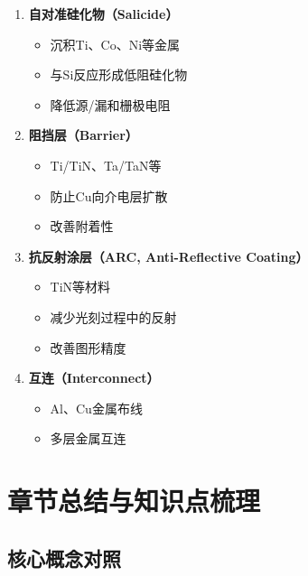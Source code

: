 \documentclass[UTF8,12pt,a4paper]{ctexart}
\begin{document}
\begin{enumerate}
    \item \textbf{自对准硅化物（Salicide）}
    \begin{itemize}
        \item 沉积Ti、Co、Ni等金属
        \item 与Si反应形成低阻硅化物
        \item 降低源/漏和栅极电阻
    \end{itemize}
    
    \item \textbf{阻挡层（Barrier）}
    \begin{itemize}
        \item Ti/TiN、Ta/TaN等
        \item 防止Cu向介电层扩散
        \item 改善附着性
    \end{itemize}
    
    \item \textbf{抗反射涂层（ARC, Anti-Reflective Coating）}
    \begin{itemize}
        \item TiN等材料
        \item 减少光刻过程中的反射
        \item 改善图形精度
    \end{itemize}
    
    \item \textbf{互连（Interconnect）}
    \begin{itemize}
        \item Al、Cu金属布线
        \item 多层金属互连
    \end{itemize}
\end{enumerate}

\section{章节总结与知识点梳理}

\subsection{核心概念对照}
\end{document}
